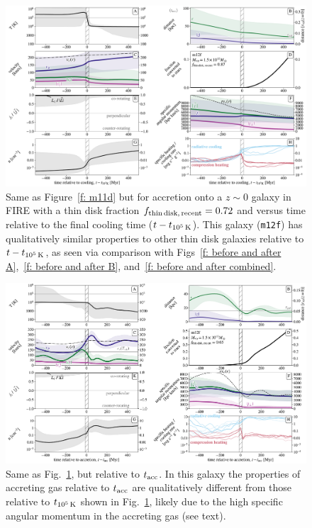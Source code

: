 \documentclass[fleqn,usenatbib]{mnras}
\newcommand{\fthin}{f_{\rm thin\,disk,\,recent}}
\newcommand{\tcools}{t_{10^5\,{\rm K}}}
\newcommand{\tacc}{t_{\rm acc}}
\begin{document}
\begin{figure}\includegraphics[width=\textwidth]{figures/before_and_after/before_and_after_allone_m12f_md.pdf}
\caption{
Same as Figure~\ref{f: m11d} but for accretion onto a $z\sim0$ galaxy in FIRE with a thin disk fraction $\fthin=0.72$ and versus time relative to the final cooling time ($t - \tcools$).
This galaxy (\texttt{m12f}) has qualitatively similar properties to other thin disk galaxies relative to $t-\tcools$, as seen via comparison with Figs~\ref{f: before and after A},~\ref{f: before and after B}, and~\ref{f: before and after combined}.
}
\label{f: m12f-tcools}
\end{figure}

\begin{figure}\includegraphics[width=\textwidth]{figures/variations/relative_to_accretion/before_and_after/before_and_after_allone_m12f_md.pdf}
\caption{
Same as Fig.~\ref{f: m12f-tcools}, but relative to $\tacc$.
In this galaxy the properties of accreting gas relative to $\tacc$ are qualitatively different from those relative to $\tcools$ shown in Fig.~\ref{f: m12f-tcools}, likely due to the high specific angular momentum in the accreting gas (see text). 
}
\label{f: m12f-tacc}
\end{figure}
\end{document}
